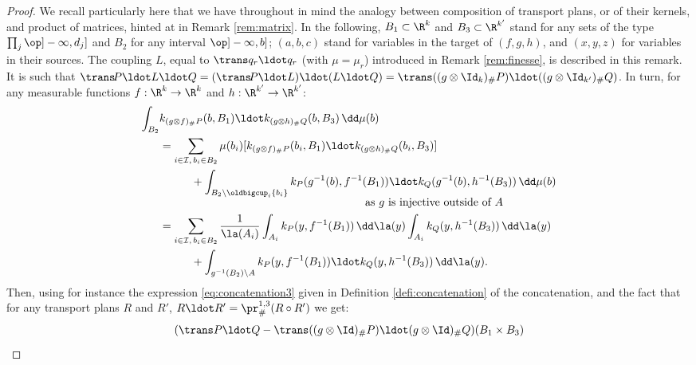 \begin{proof} We recall particularly here that we have throughout in mind the analogy between composition of transport plans, or of their kernels, and product of matrices, hinted at in Remark \ref{rem:matrix}. In the following, $B_1\subset\R^k$ and $B_3\subset\R^{k'}$ stand for any sets of the type $\prod_j\op]-\infty,d_j]$ and $B_2$ for any interval $\op]-\infty,b]$; $(a,b,c)$ stand for variables in the target of $(f,g,h)$, and $(x,y,z)$ for variables in their sources. The coupling $L$, equal to $\trans q_r\ldot q_r$ (with $\mu=\mu_r$) introduced in Remark \ref{rem:finesse}, is described in this remark. It is such that $\trans\!P\ldot L\ldot Q=(\trans\!P\ldot L)\ldot(L\ldot Q)=\trans((g\otimes \Id_{k})_\#P)\ldot((g\otimes \Id_{k'})_\#Q)$. In turn, for any measurable functions $f:\R^k\to\R^k$ and $h:\R^{k'}\to\R^{k'}$:\vspace*{-3pt}
\begin{equation}\label{eq:prelim_distributivite}
\begin{aligned}
\int_{B_2}&k_{(g\otimes f)_\#P}(b,B_1)\ldot k_{(g \otimes h)_\#Q}(b,B_3)\,\dd\mu(b)\\
&=\sum_{i\in\mathcal{I},\,b_i\in B_2}\mu(b_i)[k_{(g\otimes f)_\#P}(b_i,B_1)\ldot k_{(g\otimes h)_\#Q}(b_i,B_3)]\\
&\hspace*{1cm}+\int_{B_2\setminus\oldbigcup_i\{b_i\}}k_{P}(g^{-1}(b),f^{-1}(B_1))\ldot k_{Q}(g^{-1}(b),h^{-1}(B_3))\,\dd\mu(b)\\[-5pt]
&\hspace*{6.5cm}\text{as $g$ is injective outside of $A$}\\
&=\sum_{i\in \mathcal{I},\,b_i\in B_2}\frac1{\la(A_i)}\int_{A_i}k_{P}(y,f^{-1}(B_1))\,\dd\la(y)\int_{A_i}k_{Q}(y,h^{-1}(B_3))\,\dd\la(y)\\
&\hspace*{1cm}+\int_{g^{-1}(B_2)\setminus A}k_{P}(y,f^{-1}(B_1))\ldot k_{Q}(y,h^{-1}(B_3))\,\dd\la(y).
\end{aligned}
\end{equation}
Then, using for instance the expression \eqref{eq:concatenation3} given in Definition \ref{defi:concatenation} of the concatenation, and the fact that for any transport plans $R$ and $R'$, $R\ldot R'=\pr^{1,3}_\#(R\circ R')$ we get:\vspace*{-3pt}
\begin{align*}
(\trans P\ldot Q&-\trans((g\otimes \Id)_\#P)\ldot(g\otimes \Id)_\#Q)(B_1\times B_3)\\

\end{align*}
\end{proof}
